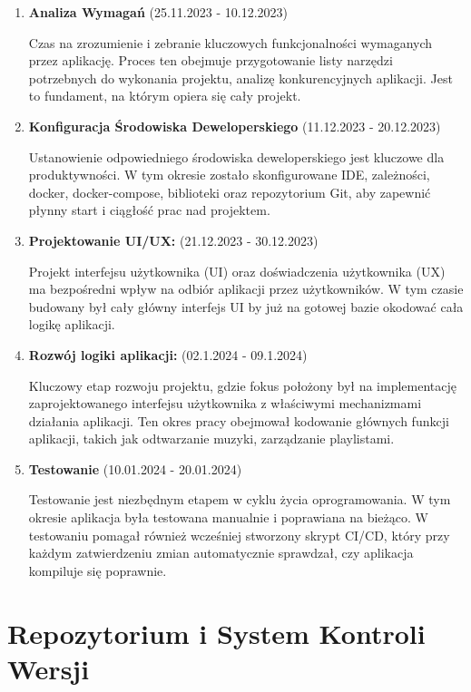 \begin{enumerate}
    \item \textbf{ Analiza Wymagań} (25.11.2023 - 10.12.2023)
    
        Czas na zrozumienie i zebranie kluczowych funkcjonalności wymaganych przez aplikację. Proces ten obejmuje przygotowanie listy narzędzi potrzebnych do wykonania projektu, analizę konkurencyjnych aplikacji. Jest to fundament, na którym opiera się cały projekt.
    \item \textbf{ Konfiguracja Środowiska Deweloperskiego} (11.12.2023 - 20.12.2023) 
    
    Ustanowienie odpowiedniego środowiska deweloperskiego jest kluczowe dla produktywności. W tym okresie zostało skonfigurowane IDE, zależności, docker, docker-compose, biblioteki oraz repozytorium Git, aby zapewnić płynny start i ciągłość prac nad projektem.
    \item \textbf{ Projektowanie UI/UX:} (21.12.2023 - 30.12.2023)
    
        Projekt interfejsu użytkownika (UI) oraz doświadczenia użytkownika (UX) ma bezpośredni wpływ na odbiór aplikacji przez użytkowników. W tym czasie budowany był cały główny interfejs UI by już na gotowej bazie okodować cała logikę aplikacji.
        \newpage

    \item \textbf{ Rozwój logiki aplikacji:} (02.1.2024 - 09.1.2024)

        Kluczowy etap rozwoju projektu, gdzie fokus położony był na implementację zaprojektowanego interfejsu użytkownika z właściwymi mechanizmami działania aplikacji. Ten okres pracy obejmował kodowanie głównych funkcji aplikacji, takich jak odtwarzanie muzyki, zarządzanie playlistami.
    \item \textbf{ Testowanie }  (10.01.2024 - 20.01.2024)
    
    Testowanie jest niezbędnym etapem w cyklu życia oprogramowania. W tym okresie aplikacja była testowana manualnie i poprawiana na bieżąco. W testowaniu pomagał również wcześniej stworzony skrypt CI/CD, który przy każdym zatwierdzeniu zmian automatycznie sprawdzał, czy aplikacja kompiluje się poprawnie.
    
\end{enumerate}

\section{Repozytorium i System Kontroli Wersji}

